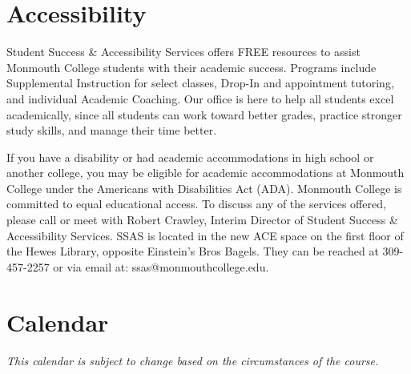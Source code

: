 \documentclass[10pt]{article}
\begin{document}
\section{Accessibility}

Student Success \& Accessibility Services offers FREE resources to assist Monmouth College students with their academic success. Programs include Supplemental Instruction for select classes, Drop-In and appointment tutoring, and individual Academic Coaching. Our office is here to help all students excel academically, since all students can work toward better grades, practice stronger study skills, and manage their time better.

If you have a disability or had academic accommodations in high school or another college, you may be eligible for academic accommodations at Monmouth College under the Americans with Disabilities Act (ADA). Monmouth College is committed to equal educational access. To discuss any of the services offered, please call or meet with Robert Crawley, Interim Director of Student Success \& Accessibility Services.  SSAS is located in the new ACE space on the first floor of the Hewes Library, opposite Einstein’s Bros Bagels. They can be reached at 309-457-2257 or via email at: ssas@monmouthcollege.edu.


\section{Calendar}

\textit{This calendar is subject to change based on the circumstances of the course.}
\end{document}
